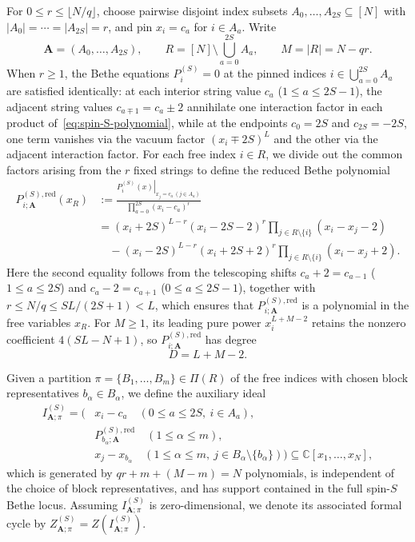 \documentclass[11pt]{article}
\theoremstyle{definition}
\newcommand{\C}{\mathbb{C}}
\begin{document}
For $0\le r\le\lfloor N/q\rfloor$, choose pairwise disjoint index subsets
$A_0,\ldots,A_{2S}\subseteq[N]$ with $|A_0|=\cdots=|A_{2S}|=r$, and pin
$x_i=c_a$ for $i\in A_a$. Write
\[
 \mathbf{A}=(A_0,\ldots,A_{2S}),\qquad
 R=[N]\setminus\bigcup_{a=0}^{2S}A_a,\qquad M=|R|=N-qr.
\]
When $r\ge 1$, the Bethe equations $P_i^{(S)}=0$ at the pinned indices $i\in\bigcup_{a=0}^{2S}A_a$ are satisfied identically: at each interior string value $c_a$ ($1\le a\le 2S-1$), the adjacent string values $c_{a\mp 1}=c_a\pm 2$ annihilate one interaction factor in each product of~\eqref{eq:spin-S-polynomial}, while at the endpoints $c_0=2S$ and $c_{2S}=-2S$, one term vanishes via the vacuum factor $(x_i\mp 2S)^L$ and the other via the adjacent interaction factor. For each free index $i\in R$, we divide out the common factors arising from the $r$ fixed strings to define the reduced Bethe polynomial
\begin{equation}\label{eq:spin-S-reduced-polynomial}
 \begin{aligned}
 P_{i;\mathbf{A}}^{(S),\mathrm{red}}(x_R)
 &:=\frac{\left.P_i^{(S)}(x)\right|_{x_j=c_a\ (j\in A_a)}}
              {\prod_{a=0}^{2S}(x_i-c_a)^r}\\
 &=(x_i+2S)^{L-r}(x_i-2S-2)^r
           \prod_{j\in R\setminus\{i\}}(x_i-x_j-2)\\
 &\quad{}-(x_i-2S)^{L-r}(x_i+2S+2)^r
           \prod_{j\in R\setminus\{i\}}(x_i-x_j+2).
 \end{aligned}
\end{equation}
Here the second equality follows from the telescoping shifts $c_a+2=c_{a-1}$ ($1\le a\le 2S$) and $c_a-2=c_{a+1}$ ($0\le a\le 2S-1$), together with $r\le N/q\le SL/(2S+1)<L$, which ensures that $P_{i;\mathbf{A}}^{(S),\mathrm{red}}$ is a polynomial in the free variables $x_R$.
For $M\ge 1$, its leading pure power $x_i^{L+M-2}$ retains the nonzero coefficient $4(SL-N+1)$, so $P_{i;\mathbf{A}}^{(S),\mathrm{red}}$ has degree
\[
 D=L+M-2.
\]

Given a partition $\pi=\{B_1,\ldots,B_m\}\in\Pi(R)$ of the free indices with chosen block representatives
$b_\alpha\in B_\alpha$, we define the auxiliary ideal
\begin{equation}\label{eq:spin-S-partition-ideal}
 \begin{aligned}
 I_{\mathbf{A};\pi}^{(S)}=\bigl(
 &x_i-c_a\quad(0\le a\le 2S,\ i\in A_a),\\
 &P_{b_\alpha;\mathbf{A}}^{(S),\mathrm{red}}
                         \quad(1\le\alpha\le m),\\
 &x_j-x_{b_\alpha}\quad
   (1\le\alpha\le m,\ j\in B_\alpha\setminus\{b_\alpha\})
 \bigr)\subseteq\C[x_1,\ldots,x_N],
 \end{aligned}
\end{equation}
which is generated by $qr+m+(M-m)=N$ polynomials, is independent of the choice of block representatives, and has support contained in the full spin-$S$ Bethe locus.
Assuming $I_{\mathbf{A};\pi}^{(S)}$ is zero-dimensional, we denote its associated formal cycle by
$Z_{\mathbf{A};\pi}^{(S)}=Z(I_{\mathbf{A};\pi}^{(S)})$.
\end{document}
